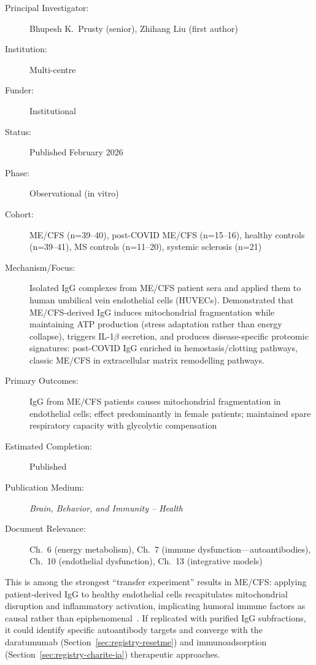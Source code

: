 \begin{description}
    \item[Principal Investigator:] Bhupesh K.\ Prusty (senior), Zhihang Liu (first author)
    \item[Institution:] Multi-centre
    \item[Funder:] Institutional
    \item[Status:] Published February 2026
    \item[Phase:] Observational (in vitro)
    \item[Cohort:] ME/CFS (n=39--40), post-COVID ME/CFS (n=15--16), healthy controls (n=39--41), MS controls (n=11--20), systemic sclerosis (n=21)
    \item[Mechanism/Focus:] Isolated IgG complexes from ME/CFS patient
        sera and applied them to human umbilical vein endothelial cells (HUVECs).  Demonstrated that
        ME/CFS-derived IgG induces mitochondrial fragmentation while maintaining ATP production (stress adaptation rather than energy collapse), triggers IL-1$\beta$ secretion, and produces disease-specific proteomic signatures: post-COVID IgG enriched in hemostasis/clotting pathways, classic ME/CFS in extracellular matrix remodelling pathways.
    \item[Primary Outcomes:] IgG from ME/CFS patients causes mitochondrial fragmentation in endothelial cells; effect predominantly in female patients; maintained spare respiratory capacity with glycolytic compensation
    \item[Estimated Completion:] Published
    \item[Publication Medium:] \textit{Brain, Behavior, and Immunity -- Health}
    \item[Document Relevance:] Ch.~6 (energy metabolism), Ch.~7 (immune
        dysfunction---autoantibodies), Ch.~10 (endothelial dysfunction), Ch.~13 (integrative models)
\end{description}

This is among the strongest ``transfer experiment'' results in ME/CFS:
applying patient-derived IgG to healthy endothelial cells recapitulates mitochondrial disruption and inflammatory activation,
implicating humoral immune factors as causal rather than
epiphenomenal~\cite{Liu2026IgGcomplexes}.  If replicated with purified IgG
subfractions, it could identify specific autoantibody targets and converge
with the daratumumab (Section~\ref{sec:registry-resetme}) and
immunoadsorption (Section~\ref{sec:registry-charite-ia}) therapeutic
approaches.

